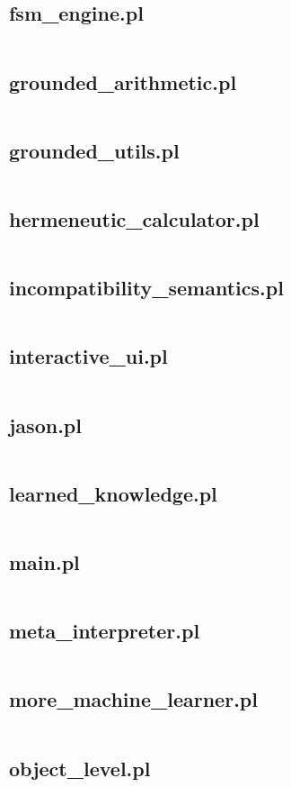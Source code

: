 \documentclass{article}
\begin{document}
\subsection{fsm\_engine.pl}
\inputminted{prolog}{fsm_engine.pl}
\subsection{grounded\_arithmetic.pl}
\inputminted{prolog}{grounded_arithmetic.pl}
\subsection{grounded\_utils.pl}
\inputminted{prolog}{grounded_utils.pl}
\subsection{hermeneutic\_calculator.pl}
\inputminted{prolog}{hermeneutic_calculator.pl}
\subsection{incompatibility\_semantics.pl}
\inputminted{prolog}{incompatibility_semantics.pl}
\subsection{interactive\_ui.pl}
\inputminted{prolog}{interactive_ui.pl}
\subsection{jason.pl}
\inputminted{prolog}{jason.pl}
\subsection{learned\_knowledge.pl}
\inputminted{prolog}{learned_knowledge.pl}
\subsection{main.pl}
\inputminted{prolog}{main.pl}
\subsection{meta\_interpreter.pl}
\inputminted{prolog}{meta_interpreter.pl}
\subsection{more\_machine\_learner.pl}
\inputminted{prolog}{more_machine_learner.pl}
\subsection{object\_level.pl}
\inputminted{prolog}{object_level.pl}
\end{document}
